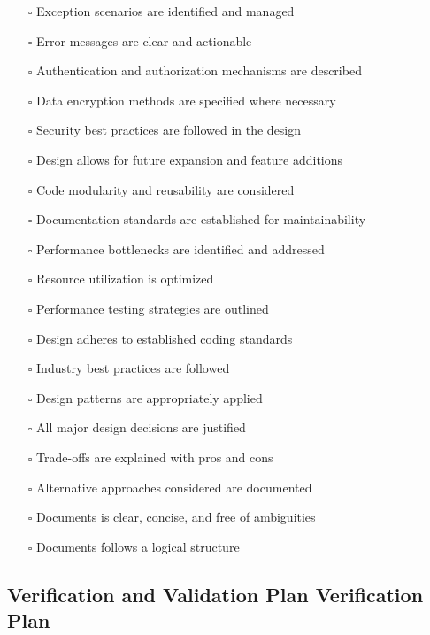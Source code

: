 \documentclass[12pt, titlepage]{article}
\begin{document}
\begin{itemize}
  \item[$\square$] Exception scenarios are identified and managed 
  \item[$\square$] Error messages are clear and actionable 
  \item[$\square$] Authentication and authorization mechanisms are described 
  \item[$\square$] Data encryption methods are specified where necessary 
  \item[$\square$] Security best practices are followed in the design
  \item[$\square$] Design allows for future expansion and feature additions 
  \item[$\square$] Code modularity and reusability are considered 
  \item[$\square$] Documentation standards are established for maintainability 
  \item[$\square$] Performance bottlenecks are identified and addressed 
  \item[$\square$] Resource utilization is optimized 
  \item[$\square$] Performance testing strategies are outlined 
  \item[$\square$] Design adheres to established coding standards 
  \item[$\square$] Industry best practices are followed 
  \item[$\square$] Design patterns are appropriately applied
  \item[$\square$] All major design decisions are justified 
  \item[$\square$] Trade-offs are explained with pros and cons 
  \item[$\square$] Alternative approaches considered are documented 
  \item[$\square$] Documents is clear, concise, and free of ambiguities 
  \item[$\square$] Documents follows a logical structure 
\end{itemize}

\subsection{Verification and Validation Plan Verification Plan}


\end{document}
